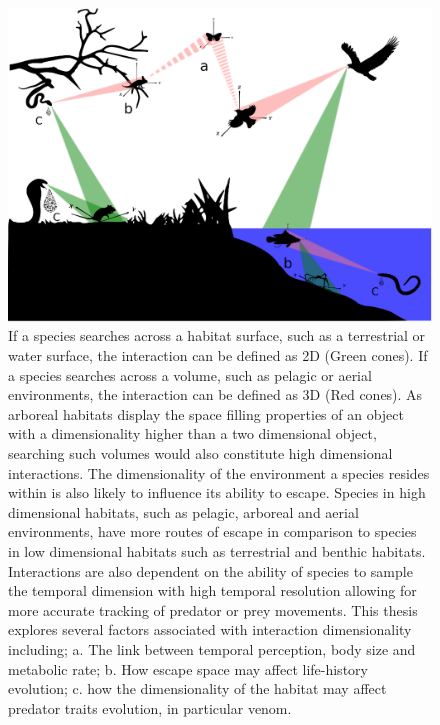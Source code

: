 \begin{figure}[!Hpt]
  \centering
  \includegraphics[keepaspectratio=true, width=1.0\textwidth,left]{ch1-introduction/fig_into.eps}\hspace*{10cm}
  \caption[ ]{If a species searches across a habitat surface, such as a terrestrial or water surface, the interaction can be defined as 2D (Green cones). If a species searches across a volume, such as pelagic or aerial environments, the interaction can be defined as 3D (Red cones). As arboreal habitats display the space filling properties of an object with a dimensionality higher than a two dimensional object, searching such volumes would also constitute high dimensional interactions. The dimensionality of the environment a species resides within is also likely to influence its ability to escape. Species in high dimensional habitats, such as pelagic, arboreal and aerial environments, have more routes of escape in comparison to species in low dimensional habitats such as terrestrial and benthic habitats. Interactions are also dependent on the ability of species to sample the temporal dimension with high temporal resolution allowing for more accurate tracking of predator or prey movements. This thesis explores several factors associated with interaction dimensionality including; a. The link between temporal perception, body size and metabolic rate; b. How escape space may affect life-history evolution; c. how the dimensionality of the habitat may affect predator traits evolution, in particular venom.}
  \label{fig:Figure 1.1}
\end{figure}


